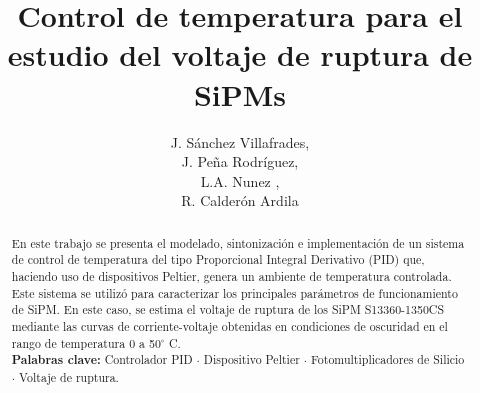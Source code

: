 \documentclass[runningheads]{llncs}
\begin{document}
%

\title{Control de temperatura para el estudio del voltaje de ruptura de SiPMs}
%
%
\author{J. Sánchez Villafrades,\\
J. Peña Rodríguez,\\
L.A. Nunez ,\\
R. Calderón Ardila 
}
%
%


\maketitle              %
%
\begin{abstract}
En este trabajo se presenta el modelado, sintonización e implementación de un sistema de control de temperatura del tipo Proporcional Integral Derivativo (PID) que, haciendo uso de dispositivos Peltier, genera un ambiente de temperatura controlada. Este sistema se utilizó para caracterizar los principales parámetros de funcionamiento de SiPM. En este caso, se estima el voltaje de ruptura de los SiPM S13360-1350CS mediante las curvas de corriente-voltaje obtenidas en condiciones de oscuridad en el rango de temperatura  0 a 50$^{\circ}$ C.\\ %


{\bf Palabras clave:} Controlador PID $\cdot$ Dispositivo Peltier $\cdot$ Fotomultiplicadores de Silicio $\cdot$ Voltaje de ruptura.
\end{abstract}
%
%
%
\end{document}
